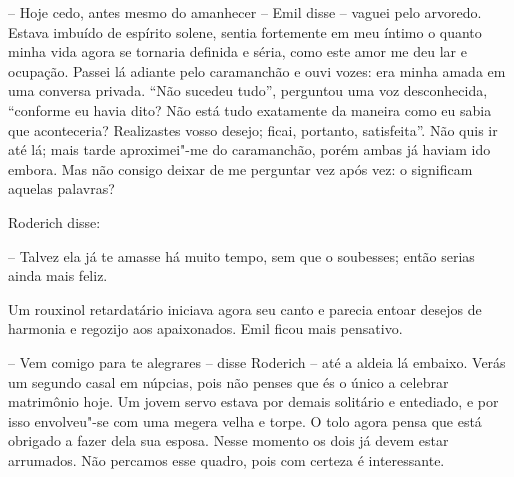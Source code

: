 -- Hoje cedo, antes mesmo do amanhecer -- Emil disse -- vaguei pelo
arvoredo. Estava imbuído de espírito solene, sentia fortemente em meu
íntimo o quanto minha vida agora se tornaria definida e séria, como
este amor me deu lar e ocupação. Passei lá adiante pelo caramanchão e
ouvi vozes: era minha amada em uma conversa privada. ``Não sucedeu
tudo'', perguntou uma voz desconhecida, ``conforme eu havia dito? Não
está tudo exatamente da maneira como eu sabia que aconteceria?
Realizastes vosso desejo; ficai, portanto, satisfeita''. Não quis ir até
lá; mais tarde aproximei"-me do caramanchão, porém ambas já haviam ido
embora. Mas não consigo deixar de me perguntar vez após vez: o
significam aquelas palavras?

Roderich disse:

-- Talvez ela já te amasse há muito tempo, sem que o soubesses;
então serias ainda mais feliz.

Um rouxinol retardatário iniciava agora seu canto e parecia entoar
desejos de harmonia e regozijo aos apaixonados. Emil ficou mais
pensativo.

-- Vem comigo para te alegrares -- disse Roderich -- até a aldeia lá
embaixo. Verás um segundo casal em núpcias, pois não penses que és o
único a celebrar matrimônio hoje. Um jovem servo estava por demais
solitário e entediado, e por isso envolveu"-se com uma megera velha e
torpe. O tolo agora pensa que está obrigado a fazer dela sua esposa.
Nesse momento os dois já devem estar arrumados. Não percamos esse
quadro, pois com certeza é interessante.

